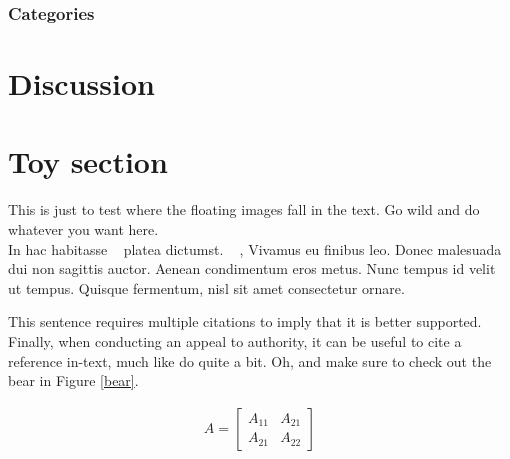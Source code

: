 \documentclass[10pt, a4paper, twocolumn]{article} %
\begin{document}
%	

\subsubsection{Categories} 


\section{Discussion}


\section{Toy section}

This is just to test where the floating images fall in the text. Go wild and do whatever  you want here.\\

In hac habitasse ~\cite{ref:sykepleirindeksen} platea dictumst. ~\cite{ref:JohnDoe} , Vivamus eu finibus leo. Donec malesuada dui non sagittis auctor. Aenean condimentum eros metus. Nunc tempus id velit ut tempus. Quisque fermentum, nisl sit amet   consectetur ornare.

This sentence requires multiple citations to imply that it is better supported. Finally, when conducting an appeal to authority, it can be useful to cite a reference in-text, much like do quite a bit. Oh, and make sure to check out the bear in Figure \ref{bear}.

\begin{align}
	A = 
	\begin{bmatrix}
		A_{11} & A_{21} \\
		A_{21} & A_{22}
	\end{bmatrix}
\end{align}
\end{document}
